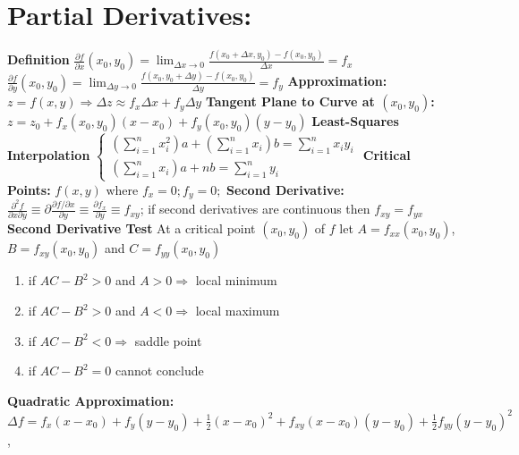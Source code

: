 \documentclass[twoside]{article}
\begin{document}
\section{Partial Derivatives:}
\textbf{Definition}\newline
\indent $\frac{\partial f}{\partial x}(x_0,y_0)=\displaystyle \lim_{\Delta x \to 0}\frac{f(x_0+\Delta{x},y_0) - f(x_0,y_0)}{\Delta{x}} = f_x$ \newline
\indent $\frac{\partial f}{\partial y}(x_0,y_0)=\displaystyle \lim_{\Delta y \to 0}\frac{f(x_0,y_0+\Delta{y}) - f(x_0,y_0)}{\Delta{y}} = f_y$\newline
\textbf{Approximation:}
\indent $ z=f(x,y) \Rightarrow \Delta{z} \approx f_x\Delta{x}+f_y\Delta{y}$\newline
\textbf{Tangent Plane to Curve at $(x_0,y_0)$:}
\indent $z=z_0+f_x(x_0,y_0)(x-x_0)+f_y(x_0,y_0)(y-y_0)$\newline
\textbf{Least-Squares Interpolation}\newline
$\left\{ 
  \begin{array}{l}
	\displaystyle (\sum_{i=1}^{n}x_i^2)a+(\sum_{i=1}^{n}x_i)b = \sum_{i=1}^{n}x_iy_i \\
	\displaystyle (\sum_{i=1}^{n}x_i)a+nb=\sum_{i=1}^{n}y_i
  \end{array}
\right.$ \newline
\textbf{Critical Points:} $f(x,y) \text{ where } f_x=0;f_y=0;$ \newline
\textbf{Second Derivative:} $\displaystyle \frac{{\partial}^2{f}}{\partial{x}\partial{y}}\equiv\partial{\frac{\partial{f}/\partial{x}}{\partial{y}}}\equiv\frac{\partial{f_x}}{\partial{y}}\equiv f_{xy}$; if second derivatives are continuous then $f_{xy}=f_{yx}$\newline
\textbf{Second Derivative Test} \newline
\indent At a critical point $(x_0,y_0)$ of $f$ let $A=f_{xx}(x_0,y_0)$, $B=f_{xy}(x_0,y_0)$ and $C=f_{yy}(x_0,y_0)$
\begin{enumerate}
\item if $AC-B^2>0$ and $A>0 \Rightarrow$ local minimum
\item if $AC-B^2>0$ and $A<0 \Rightarrow$ local maximum
\item if $AC-B^2<0 \Rightarrow$ saddle point
\item if $AC-B^2=0$ cannot conclude
\end{enumerate}
\textbf{Quadratic Approximation:}\newline
\indent $\Delta{f}=f_x(x-x_0)+f_y(y-y_0)+\frac{1}{2}(x-x_0)^2+f_{xy}(x-x_0)(y-y_0)+\frac{1}{2}f_{yy}(y-y_0)^2$,\newline
\end{document}
